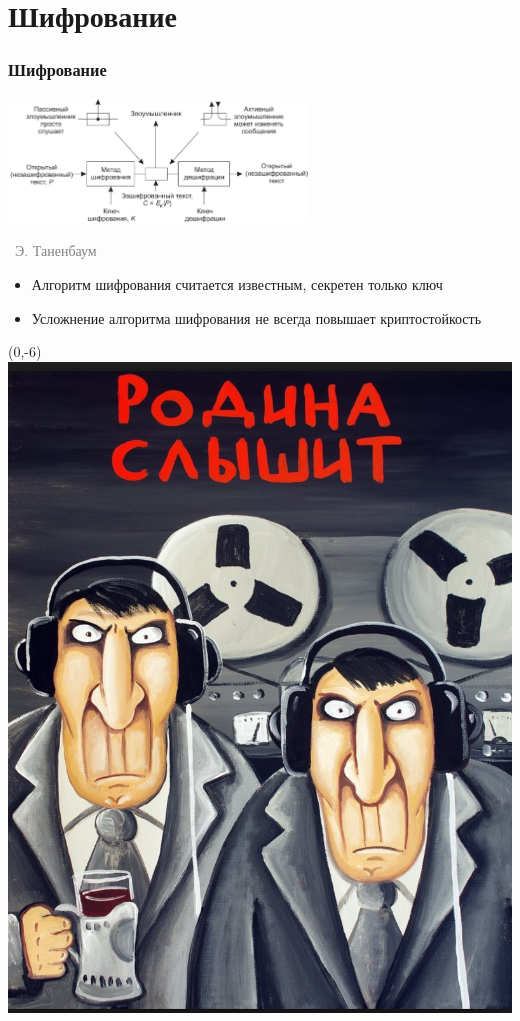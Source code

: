 \documentclass[xetex,mathserif,serif]{beamer}
\newcommand{\attribution}[1] {
\vspace{-5mm}\begin{flushright}\begin{scriptsize}\textcolor{gray}{\textcopyright\, #1}\end{scriptsize}\end{flushright}
}
\begin{document}
	\section{Шифрование}

	\begin{frame}
		\frametitle{Шифрование}
		\begin{center}
			\includegraphics[width=0.6\textwidth]{cryptography.png}
			\attribution{Э. Таненбаум}
		\end{center}
		\begin{itemize}
			\item Алгоритм шифрования считается известным, секретен только ключ
			\item Усложнение алгоритма шифрования не всегда повышает криптостойкость
		\end{itemize}
		\begin{textblock}{2}(0,-6)
			\includegraphics[width=\textwidth]{youAreBeingWatched.png}
		\end{textblock}
	\end{frame}
\end{document}
